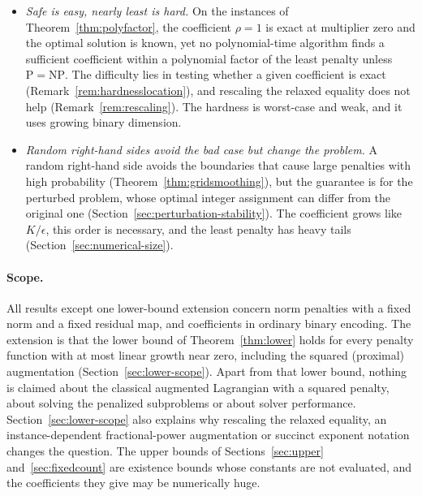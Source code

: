 \begin{itemize}
 equality, optimizing the multiplier reduces the required coefficient by
 at most a factor of two when both one-sided rates are nonnegative
 (Proposition~\ref{prop:scalar}). For several relaxed equalities we prove
 no such factor bound.
\item \emph{Safe is easy, nearly least is hard.} On the instances of
 Theorem~\ref{thm:polyfactor}, the coefficient $\rho=1$ is exact at
 multiplier zero and the optimal solution is known, yet no
 polynomial-time algorithm finds a sufficient coefficient within a
 polynomial factor of the least penalty unless $\mathrm P=\mathrm{NP}$.
 The difficulty lies in testing whether a given coefficient is exact
 (Remark~\ref{rem:hardnesslocation}), and rescaling the relaxed equality
 does not help (Remark~\ref{rem:rescaling}). The hardness is worst-case
 and weak, and it uses growing binary dimension.
\item \emph{Random right-hand sides avoid the bad case but change the
 problem.} A random right-hand side avoids the boundaries that cause large
 penalties with high probability (Theorem~\ref{thm:gridsmoothing}), but
 the guarantee is for the perturbed problem, whose optimal integer
 assignment can differ from the original one
 (Section~\ref{sec:perturbation-stability}). The coefficient grows like
 $K/\epsilon$, this order is necessary, and the least penalty has heavy
 tails (Section~\ref{sec:numerical-size}).
\end{itemize}

\paragraph{Scope.}
All results except one lower-bound extension concern norm penalties with
a fixed norm and a fixed residual map, and coefficients in ordinary
binary encoding. The extension is that the lower bound of
Theorem~\ref{thm:lower} holds for every penalty function with at most
linear growth near zero, including the squared (proximal) augmentation
(Section~\ref{sec:lower-scope}). Apart from that lower bound, nothing is
claimed about the classical augmented Lagrangian with a squared penalty,
about solving the penalized subproblems or about solver performance.
Section~\ref{sec:lower-scope} also explains why rescaling the relaxed
equality, an instance-dependent fractional-power augmentation or
succinct exponent notation changes the question. The upper bounds of
Sections~\ref{sec:upper} and~\ref{sec:fixedcount} are existence bounds
whose constants are not evaluated, and the coefficients they give may be
numerically huge.

